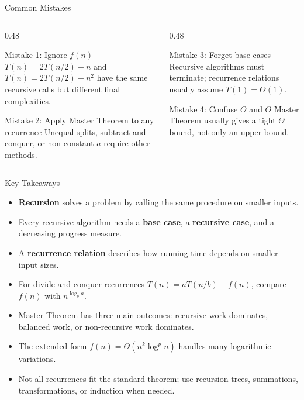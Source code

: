 \documentclass[aspectratio=169]{beamer}
\begin{document}
\begin{frame}{Common Mistakes}
  \small
  \begin{columns}[T]
    \begin{column}{0.48\textwidth}
      \begin{alertblock}{Mistake 1: Ignore $f(n)$}
        \small
        $T(n)=2T(n/2)+n$ and $T(n)=2T(n/2)+n^2$ have the same recursive calls but different final complexities.
      \end{alertblock}
      \begin{alertblock}{Mistake 2: Apply Master Theorem to any recurrence}
        \small
        Unequal splits, subtract-and-conquer, or non-constant $a$ require other methods.
      \end{alertblock}
    \end{column}
    \begin{column}{0.48\textwidth}
      \begin{alertblock}{Mistake 3: Forget base cases}
        \small
        Recursive algorithms must terminate; recurrence relations usually assume $T(1)=\Theta(1)$.
      \end{alertblock}
      \begin{alertblock}{Mistake 4: Confuse $O$ and $\Theta$}
        \small
        Master Theorem usually gives a tight $\Theta$ bound, not only an upper bound.
      \end{alertblock}
    \end{column}
  \end{columns}
\end{frame}

\begin{frame}{Key Takeaways}
  \small
  \begin{itemize}
    \setlength{\itemsep}{0.35em}
    \item \textbf{Recursion} solves a problem by calling the same procedure on smaller inputs.
    \item Every recursive algorithm needs a \textbf{base case}, a \textbf{recursive case}, and a decreasing progress measure.
    \item A \textbf{recurrence relation} describes how running time depends on smaller input sizes.
    \item For divide-and-conquer recurrences $T(n)=aT(n/b)+f(n)$, compare $f(n)$ with $n^{\log_b a}$.
    \item Master Theorem has three main outcomes: recursive work dominates, balanced work, or non-recursive work dominates.
    \item The extended form $f(n)=\Theta(n^k\log^p n)$ handles many logarithmic variations.
    \item Not all recurrences fit the standard theorem; use recursion trees, summations, transformations, or induction when needed.
  \end{itemize}
\end{frame}
\end{document}
